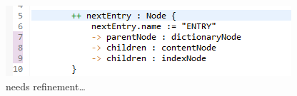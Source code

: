 \begin{figure}[htp]
\begin{center}
  \includegraphics[width=\textwidth]{eclipse_ForAllEntryRule_updated}
  \caption[labelInTOC]{needs refinement\ldots}
  \label{eclipse:generatedBkwrdMdl}
\end{center}
\end{figure}




